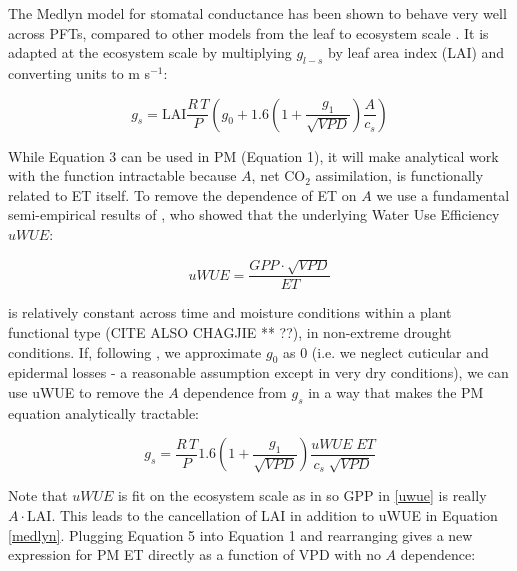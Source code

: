 \documentclass[draft,linenumbers]{agujournal}
\begin{document}
The Medlyn model for stomatal conductance has been shown to behave very well across PFTs, compared to other models from the leaf to ecosystem scale \citep[ZHOU ET AL AS WELL** ?? - Pierre says Zhou 2014][]{Lin_2015, Zhou_2015}. It is adapted at the ecosystem scale by multiplying $g_{l-s}$ by leaf area index (LAI) and converting units to m s$^{-1}$:

\begin{linenomath*}
  \label{medlyn}
  \begin{equation}
  g_s = \text{LAI} \frac{R \,T}{P} \left( g_0 + 1.6 \left(1 + \frac{g_1}{\sqrt{VPD}}\right) \frac{A}{c_s}\right)
  \end{equation}
\end{linenomath*}

While Equation 3 can be used in PM (Equation 1), it will make analytical work with the function intractable because $A$, net CO$_2$ assimilation, is functionally related to ET itself. To remove the dependence of ET on $A$ we use a fundamental semi-empirical results of \citet{Zhou_2015}, who showed that the underlying Water Use Efficiency $uWUE$:

\begin{linenomath*}
  \begin{equation}
    \label{uwue}
uWUE = \frac{GPP \cdot \sqrt{VPD}}{ET}
  \end{equation}
\end{linenomath*}
is relatively constant across time and moisture conditions within a plant functional type (CITE ALSO CHAGJIE ** ??), in non-extreme drought conditions. If, following \citet{Lin_2015}, we approximate $g_0$ as $0$ (i.e. we neglect cuticular and epidermal losses - a reasonable assumption except in very dry conditions), we can use uWUE to remove the $A$ dependence from $g_s$ in a way that makes the PM equation analytically tractable:

\begin{linenomath*}
  \begin{equation}
  g_s = \frac{R \, T}{P} 1.6 \left(1 + \frac{g_1}{\sqrt{VPD}}\right) \frac{uWUE \; ET}{c_s \; \sqrt{VPD}}
  \end{equation}
\end{linenomath*}

Note that $uWUE$ is fit on the ecosystem scale as in \citet{Zhou_2015} so GPP in \ref{uwue} is really $A\cdot \text{LAI}$. This leads to the cancellation of LAI in addition to uWUE in Equation \ref{medlyn}. Plugging Equation 5 into Equation 1 and rearranging gives a new expression for PM ET directly as a function of VPD with no $A$ dependence:
\end{document}

